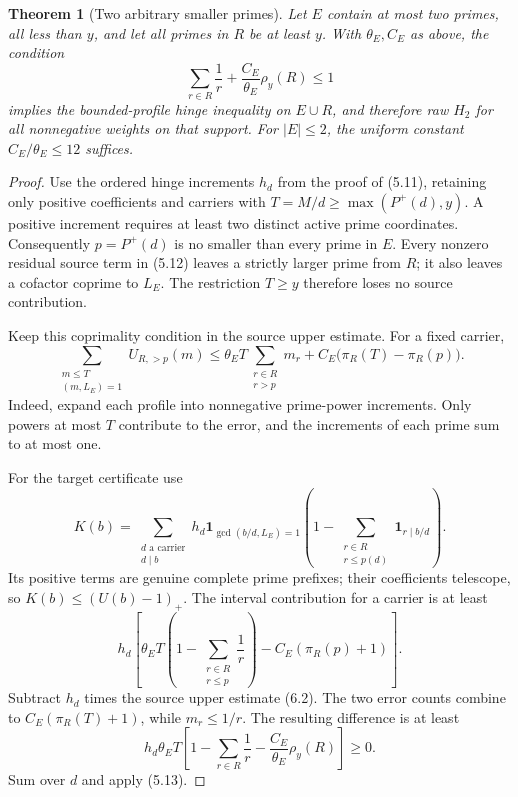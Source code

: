 \documentclass[11pt,a4paper]{article}
\newtheorem{theorem}{Theorem}[section]
\theoremstyle{remark}
\newcommand{\pos}[1]{\left(#1\right)_+}
\newcommand{\ind}{\mathbf 1}
\begin{document}
\begin{theorem}[Two arbitrary smaller primes]
\label{thm:twoanchors}
Let \(E\) contain at most two primes, all less than \(y\), and let all
primes in \(R\) be at least \(y\). With \(\theta_E,C_E\) as above, the condition
\[
 \sum_{r\in R}\frac1r+\frac{C_E}{\theta_E}\rho_y(R)\le1
 \tag{6.1}
\]
implies the bounded-profile hinge inequality on \(E\cup R\), and
therefore raw \(H_2\) for all nonnegative weights on that support.
For \(|E|\le2\), the uniform constant \(C_E/\theta_E\le12\) suffices.
\end{theorem}
\begin{proof}
Use the ordered hinge increments \(h_d\) from the proof of (5.11),
retaining only positive coefficients and carriers with
\(T=M/d\ge\max(P^+(d),y)\). A positive increment requires at least
two distinct active prime coordinates. Consequently
\(p=P^+(d)\) is no smaller than every prime in \(E\).
Every nonzero residual source term in (5.12)
leaves a strictly larger prime from \(R\); it also leaves a cofactor
coprime to \(L_E\). The restriction \(T\ge y\) therefore loses no
source contribution.

Keep this coprimality condition in the source upper estimate.
For a fixed carrier,
\[
 \sum_{\substack{m\le T\\(m,L_E)=1}}U_{R,>p}(m)
 \le
 \theta_ET\sum_{\substack{r\in R\\r>p}}m_r
 +C_E\bigl(\pi_R(T)-\pi_R(p)\bigr).
 \tag{6.2}
\]
Indeed, expand each profile into nonnegative prime-power increments.
Only powers at most \(T\) contribute to the error, and the increments
of each prime sum to at most one.

For the target certificate use
\[
 K(b)=\sum_{\substack{d\text{ a carrier}\\d\mid b}} h_d
 \ind_{\gcd(b/d,L_E)=1}
 \left(1-\sum_{\substack{r\in R\\r\le p(d)}}\ind_{r\mid b/d}\right).
 \tag{6.3}
\]
Its positive terms are genuine complete prime prefixes; their
coefficients telescope, so \(K(b)\le\pos{U(b)-1}\).
The interval contribution for a carrier is at least
\[
 h_d\left[
 \theta_ET\left(1-\sum_{\substack{r\in R\\r\le p}}\frac1r\right)
 -C_E(\pi_R(p)+1)\right].
 \tag{6.4}
\]
Subtract \(h_d\) times the source upper estimate (6.2). The two error counts
combine to \(C_E(\pi_R(T)+1)\), while \(m_r\le1/r\).
The resulting difference is at least
\[
 h_d\theta_ET
 \left[1-\sum_{r\in R}\frac1r
             -\frac{C_E}{\theta_E}\rho_y(R)\right]\ge0.
 \]
Sum over \(d\) and apply (5.13).
\end{proof}
\end{document}
